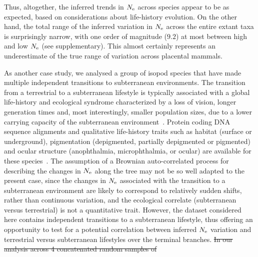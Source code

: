 \documentclass{article}
\providecommand{\DIFdeltex}[1]{{\protect\color{red}\sout{#1}}}                      %
\providecommand{\DIFaddbegin}{} %
\providecommand{\DIFdelbegin}{} %
\providecommand{\DIFdelend}{} %
\providecommand{\DIFdel}[1]{\texorpdfstring{\DIFdeltex{#1}}{}} %
\begin{document}
    Thus, altogether, the inferred trends in $N_{\text{e}}$ across species appear to be as expected, based on considerations about life-history evolution.
    On the other hand, the total range of the inferred variation in $N_{\text{e}}$ across the entire extant taxa is surprisingly narrow, with one order of magnitude ($9.2$) at most between high and low $N_{\text{e}}$ (see supplementary).
    This almost certainly represents an underestimate of the true range of variation across placental mammals.

    As another case study, we analysed a group of isopod species that have made multiple independent transitions to subterranean environments.
    The transition from a terrestrial to a subterranean lifestyle is typically associated with a global life-history and ecological syndrome characterized by a loss of vision, longer generation times and, most interestingly, smaller population sizes, due to a lower carrying capacity of the subterranean environment~\citep{Capderrey2013}.
    Protein coding {DNA} sequence alignments and qualitative life-history traits such as habitat (surface or underground), pigmentation (depigmented, partially depigmented or pigmented) and ocular structure (anophthalmia, microphthalmia, or ocular) are available for these species~\citep{Eme2013,Saclier2018}.
    The assumption of a Brownian auto-correlated process for describing the changes in $N_{\text{e}}$ along the tree may not be so well adapted to the present case, since the changes in $N_{\text{e}}$ associated with the transition to a subterranean environment are likely to correspond to relatively sudden shifts, rather than continuous variation, and the ecological correlate (subterranean versus terrestrial) is not a quantitative trait.
    However, the dataset considered here contains independent transitions to a subterranean lifestyle, thus offering an opportunity to test for a potential correlation between inferred $N_{\text{e}}$ variation and terrestrial versus subterranean lifestyles over the terminal branches.
\DIFdelbegin \DIFdel{In our analysis across 4 concatenated random samples of }\DIFdelend \DIFaddbegin 
\end{document}
